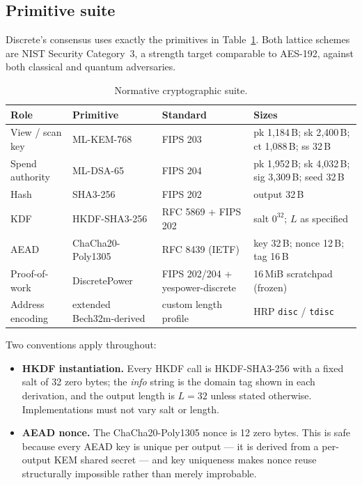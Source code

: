 \documentclass[11pt,a4paper]{article}
\newcommand{\code}[1]{\texttt{\small #1}}
\begin{document}
\subsection{Primitive suite}

Discrete's consensus uses exactly the primitives in
Table~\ref{tab:primitives}. Both lattice schemes are NIST Security
Category~3, a strength target comparable to AES-192, against both classical
and quantum adversaries.

\begin{table}[htbp]
\centering
\caption{Normative cryptographic suite.}
\label{tab:primitives}
\footnotesize
\begin{tabularx}{\textwidth}{@{}lllX@{}}
\toprule
\textbf{Role} & \textbf{Primitive} & \textbf{Standard} & \textbf{Sizes} \\
\midrule
View / scan key & ML-KEM-768 & FIPS 203 & pk 1{,}184\,B; sk 2{,}400\,B; ct 1{,}088\,B; ss 32\,B \\
Spend authority & ML-DSA-65 & FIPS 204 & pk 1{,}952\,B; sk 4{,}032\,B; sig 3{,}309\,B; seed 32\,B \\
Hash & SHA3-256 & FIPS 202 & output 32\,B \\
KDF & HKDF-SHA3-256 & RFC 5869 + FIPS 202 & salt $0^{32}$; $L$ as specified \\
AEAD & ChaCha20-Poly1305 & RFC 8439 (IETF) & key 32\,B; nonce 12\,B; tag 16\,B \\
Proof-of-work & DiscretePower & FIPS 202/204 + yespower-discrete & 16\,MiB scratchpad (frozen) \\
Address encoding & extended Bech32m-derived & custom length profile & HRP \code{disc} / \code{tdisc} \\
\bottomrule
\end{tabularx}
\end{table}

\noindent Two conventions apply throughout:

\begin{itemize}
\item \textbf{HKDF instantiation.} Every HKDF call is HKDF-SHA3-256 with a
  fixed salt of 32 zero bytes; the \emph{info} string is the domain tag shown
  in each derivation, and the output length is $L{=}32$ unless stated
  otherwise. Implementations must not vary salt or length.
\item \textbf{AEAD nonce.} The ChaCha20-Poly1305 nonce is 12 zero bytes.
  This is safe because every AEAD key is unique per output --- it is derived
  from a per-output KEM shared secret --- and key uniqueness makes nonce reuse
  structurally impossible rather than merely improbable.
\end{itemize}
\end{document}
